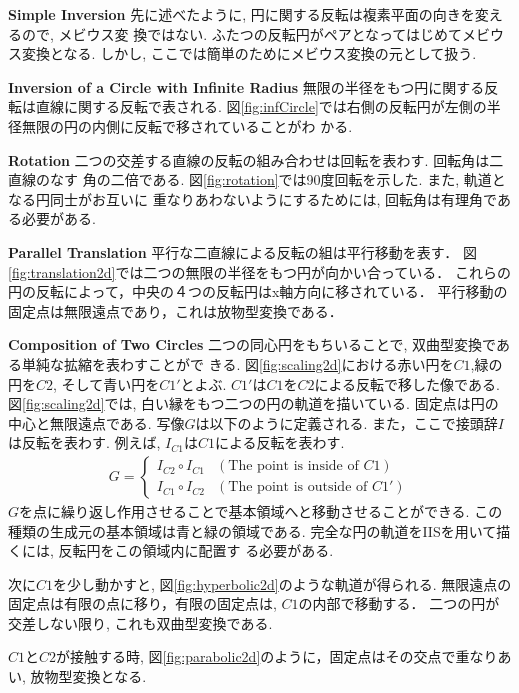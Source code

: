 \noindent\textbf{Simple Inversion}
先に述べたように, 円に関する反転は複素平面の向きを変えるので, メビウス変
換ではない.
ふたつの反転円がペアとなってはじめてメビウス変換となる.
しかし, ここでは簡単のためにメビウス変換の元として扱う.

\noindent\textbf{Inversion of a Circle with Infinite Radius}
無限の半径をもつ円に関する反転は直線に関する反転で表される.
図\ref{fig:infCircle}では右側の反転円が左側の半径無限の円の内側に反転で移されていることがわ
かる.

\noindent\textbf{Rotation}
二つの交差する直線の反転の組み合わせは回転を表わす. 回転角は二直線のなす
角の二倍である. 図\ref{fig:rotation}では90度回転を示した. また, 軌道となる円同士がお互いに
重なりあわないようにするためには, 回転角は有理角である必要がある.

\noindent\textbf{Parallel Translation}
平行な二直線による反転の組は平行移動を表す．
図\ref{fig:translation2d}では二つの無限の半径をもつ円が向かい合っている．
これらの円の反転によって，中央の４つの反転円はx軸方向に移されている．
平行移動の固定点は無限遠点であり，これは放物型変換である．

\noindent\textbf{Composition of Two Circles}
二つの同心円をもちいることで, 双曲型変換である単純な拡縮を表わすことがで
きる.
図\ref{fig:scaling2d}における赤い円を$C1$,緑の円を$C2$, そして青い円を$C1'$とよぶ.
$C1'$は$C1$を$C2$による反転で移した像である.
図\ref{fig:scaling2d}では, 白い縁をもつ二つの円の軌道を描いている.
固定点は円の中心と無限遠点である.
写像$G$は以下のように定義される.
また，ここで接頭辞$I$は反転を表わす.
例えば, $I_{C1}$は$C1$による反転を表わす.
\begin{align*}
 G =
  \begin{cases}
   I_{C2} \circ I_{C1} & (\text{The point is inside of } C1) \\
   I_{C1} \circ I_{C2} & (\text{The point is outside of } C1')
  \end{cases}
\end{align*}
$G$を点に繰り返し作用させることで基本領域へと移動させることができる.
この種類の生成元の基本領域は青と緑の領域である.
完全な円の軌道をIISを用いて描くには, 反転円をこの領域内に配置す
る必要がある.

次に$C1$を少し動かすと, 図\ref{fig:hyperbolic2d}のような軌道が得られる.
無限遠点の固定点は有限の点に移り，有限の固定点は, $C1$の内部で移動する． 
二つの円が交差しない限り, これも双曲型変換である.

$C1$と$C2$が接触する時, 図\ref{fig:parabolic2d}のように，固定点はその交点で重なりあい, 放物型変換となる.

